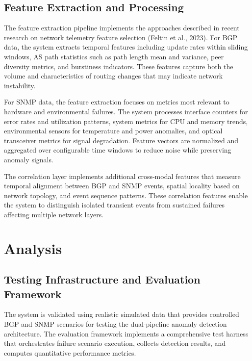 \documentclass[11pt]{article}
\begin{document}
\subsection{Feature Extraction and Processing}

The feature extraction pipeline implements the approaches described in recent research on network telemetry feature selection (Feltin et al., 2023). For BGP data, the system extracts temporal features including update rates within sliding windows, AS path statistics such as path length mean and variance, peer diversity metrics, and burstiness indicators. These features capture both the volume and characteristics of routing changes that may indicate network instability.

For SNMP data, the feature extraction focuses on metrics most relevant to hardware and environmental failures. The system processes interface counters for error rates and utilization patterns, system metrics for CPU and memory trends, environmental sensors for temperature and power anomalies, and optical transceiver metrics for signal degradation. Feature vectors are normalized and aggregated over configurable time windows to reduce noise while preserving anomaly signals.

The correlation layer implements additional cross-modal features that measure temporal alignment between BGP and SNMP events, spatial locality based on network topology, and event sequence patterns. These correlation features enable the system to distinguish isolated transient events from sustained failures affecting multiple network layers.

\section{Analysis}

\subsection{Testing Infrastructure and Evaluation Framework}

The system is validated using realistic simulated data that provides controlled BGP and SNMP scenarios for testing the dual-pipeline anomaly detection architecture. The evaluation framework implements a comprehensive test harness that orchestrates failure scenario execution, collects detection results, and computes quantitative performance metrics.
\end{document}
